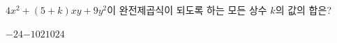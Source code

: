 $4x^2+(5+k)xy+9y^2$이 완전제곱식이 되도록 하는 모든 상수 $k$의 값의 합은?
\begin{choices32}{$-24$}{$-10$}{$2$}{$10$}{$24$}\end{choices32}
